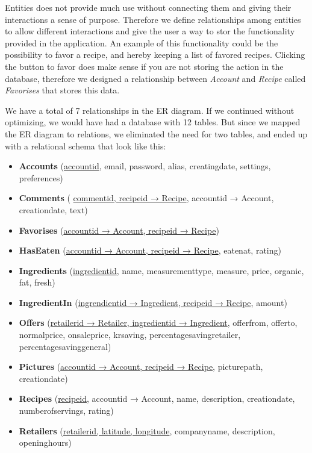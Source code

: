 Entities does not provide much use without connecting them and giving their interactions a sense of purpose. Therefore we define relationships among entities to allow different interactions and give the user a way to stor the functionality provided in the application. An example of this functionality could be the possibility to favor a recipe, and hereby keeping a list of favored recipes. Clicking the button to favor does make sense if you are not storing the action in the database, therefore we designed a relationship between \textit{Account} and \textit{Recipe} called \textit{Favorises} that stores this data.

We have a total of 7 relationships in the ER diagram. If we continued without optimizing, we would have had a database with 12 tables. But since we mapped the ER diagram to relations, we eliminated the need for two tables, and ended up with a relational schema that look like this:

\begin{itemize}
\item \textbf{Accounts} (\underline{accountid}, email, password, alias, creatingdate, settings, preferences)
%
\item \textbf{Comments} ( \underline{commentid, recipeid → Recipe}, accountid → Account, creationdate, text)

\item \textbf{Favorises} (\underline{accountid → Account, recipeid → Recipe})

\item \textbf{HasEaten} (\underline{accountid → Account, recipeid → Recipe}, eatenat, rating)

\item \textbf{Ingredients} (\underline{ingredientid}, name, measurementtype, measure, price, organic, fat, fresh)

\item \textbf{IngredientIn} (\underline{ingrendientid → Ingredient, recipeid → Recipe}, amount)

\item \textbf{Offers} (\underline{retailerid → Retailer, ingredientid → Ingredient}, offerfrom, offerto, normalprice, onsaleprice, krsaving, percentagesavingretailer, percentagesavinggeneral)

\item \textbf{Pictures} (\underline{accountid → Account, recipeid → Recipe}, picturepath, creationdate)

\item \textbf{Recipes} (\underline{recipeid}, accountid → Account, name, description, creationdate, numberofservings, rating)

\item \textbf{Retailers} (\underline{retailerid, latitude, longitude}, companyname, description, openinghours)
\end{itemize}

